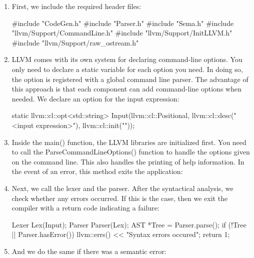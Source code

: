 \begin{enumerate}
\item
First, we include the required header files:

\begin{cpp}
#include "CodeGen.h"
#include "Parser.h"
#include "Sema.h"
#include "llvm/Support/CommandLine.h"
#include "llvm/Support/InitLLVM.h"
#include "llvm/Support/raw_ostream.h"
\end{cpp}

\item
LLVM comes with its own system for declaring command-line options. You only need to declare a static variable for each option you need. In doing so, the option is registered with a global command line parser. The advantage of this approach is that each component can add command-line options when needed. We declare an option for the input expression:

\begin{cpp}
static llvm::cl::opt<std::string>
    Input(llvm::cl::Positional,
        llvm::cl::desc("<input expression>"),
        llvm::cl::init(""));
\end{cpp}

\item
Inside the main() function, the LLVM libraries are initialized first. You need to call the ParseCommandLineOptions() function to handle the options given on the command line. This also handles the printing of help information. In the event of an error, this method exits the application:

\begin{cpp}
int main(int argc, const char **argv) {
    llvm::InitLLVM X(argc, argv);
    llvm::cl::ParseCommandLineOptions(
        argc, argv, "calc - the expression compiler\n");
\end{cpp}

\item
Next, we call the lexer and the parser. After the syntactical analysis, we check whether any errors occurred. If this is the case, then we exit the compiler with a return code indicating a failure:

\begin{cpp}
    Lexer Lex(Input);
    Parser Parser(Lex);
    AST *Tree = Parser.parse();
    if (!Tree || Parser.hasError()) {
        llvm::errs() << "Syntax errors occured\n";
        return 1;
    }
\end{cpp}

\item
And we do the same if there was a semantic error:


\end{enumerate}
